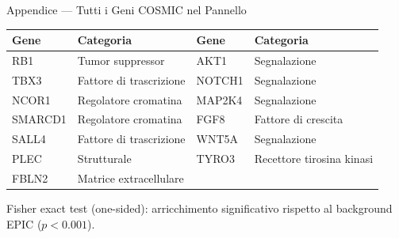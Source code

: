 \documentclass{beamer}
\begin{document}
\begin{frame}{Appendice — Tutti i Geni COSMIC nel Pannello}

\vspace{0.5em}
\centering
{\footnotesize
\renewcommand{\arraystretch}{1.2}
\begin{tabular}{llll}
\toprule
\textbf{Gene} & \textbf{Categoria} & \textbf{Gene} & \textbf{Categoria} \\
\midrule
RB1     & Tumor suppressor        & AKT1   & Segnalazione \\
TBX3    & Fattore di trascrizione & NOTCH1 & Segnalazione \\
NCOR1   & Regolatore cromatina    & MAP2K4 & Segnalazione \\
SMARCD1 & Regolatore cromatina    & FGF8   & Fattore di crescita \\
SALL4   & Fattore di trascrizione & WNT5A  & Segnalazione \\
PLEC    & Strutturale             & TYRO3  & Recettore tirosina kinasi \\
FBLN2   & Matrice extracellulare  &        & \\
\bottomrule
\end{tabular}
}

\vspace{0.5em}
{\scriptsize Fisher exact test (one-sided): arricchimento significativo
rispetto al background EPIC ($p < 0.001$).}

\end{frame}
\end{document}
